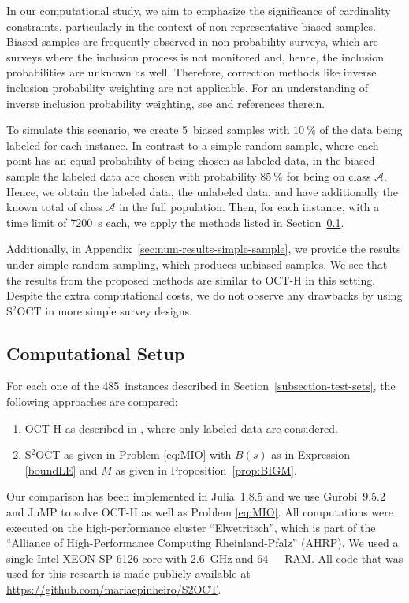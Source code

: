 \documentclass[a4paper,american,reqno]{amsart}
\newcommand{\codename}[1]{\textsf{#1}}
\newcommand{\rev}[1]{#1}
\begin{document}


In our computational study, we aim to emphasize the significance of
cardinality constraints, particularly in the context of non-representative
biased samples.  Biased samples are frequently observed in non-probability
surveys, which are surveys where the inclusion process is not
monitored and, hence, the inclusion probabilities are unknown as
well. Therefore, correction methods like inverse inclusion probability
weighting are not applicable. For an understanding of inverse
inclusion probability weighting, see \textcite{Skinner2011} and
references therein.

To simulate this scenario, we create 5~biased samples with
$\SI{10}{\percent}$ of the data being labeled for each instance.
In contrast to a simple random sample,  where each point has an equal
probability of being chosen as labeled data, in the biased sample the
labeled data are chosen with probability $\SI{85}{\percent}$ for being
on class $\mathcal{A}$.
\rev{Hence, we obtain the labeled data, the unlabeled data, and have additionally the known total of class $\mathcal{A}$ in the full population.}
Then, for each instance, with a
time limit of \SI{7200}{\second} each, we apply the methods listed in
Section~\ref{subsection-comp-setup}.

Additionally, in Appendix~\ref{sec:num-results-simple-sample}, we
provide the results under simple random sampling, which produces
unbiased samples. We see that the results from the proposed methods
are similar to OCT-H \parencite{Bertsimas2017} in this
setting. Despite the extra computational costs, we do not observe
any drawbacks by using S$^2$OCT in more simple survey designs.


\subsection{Computational Setup}
\label{subsection-comp-setup}

For each one of the 485~instances described in
Section~\ref{subsection-test-sets}, the following approaches are
compared:
\begin{enumerate}
\item[(a)] OCT-H as described in \textcite{Bertsimas2017}, where only
  labeled  data are considered.
\item[(b)] S$^2$OCT as given in Problem \eqref{eq:MIO} with $B(s)$ as
  in Expression \eqref{boundLE} and $M$ as given in
  Proposition~\ref{prop:BIGM}.
\end{enumerate}
Our comparison has been implemented in \codename{Julia}~1.8.5 and we
use \codename{Gurobi}~9.5.2 and
\codename{JuMP} \parencite{DunningHuchetteLubin2017} to solve  OCT-H
as well as  Problem \eqref{eq:MIO}. All computations were executed on
the high-performance cluster ``Elwetritsch'', which is part of the
``Alliance of High-Performance Computing Rheinland-Pfalz'' (AHRP). We
used a single Intel XEON SP 6126 core with \SI{2.6}{\giga\hertz} and
\SI{64}{\giga\byte}~RAM. \rev{All code that was used for this research is made publicly available at
\url{https://github.com/mariaepinheiro/S2OCT}.}
\end{document}
